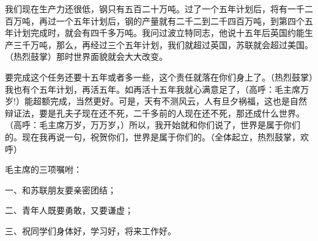 我们现在生产力还很低，钢只有五百二十万吨。过了一个五年计划后，将有一千二百万吨，再过一个五年计划后，钢的产量就有二千二到二千四百万吨，到第四个五年计划完成时，就会有四千多万吨。我问过波立特同志，他说十五年后英国约能生产三千万吨，那么，再经过三个五年计划，我们就超过英国，苏联就会超过美国。（热烈鼓掌）那时世界面貌就会大大改变。

要完成这个任务还要十五年或者多一些，这个责任就落在你们身上了。（热烈鼓掌）我也有个五年计划，再活五年。如再活十五年我就心满意足了，（高呼：毛主席万岁!）能超额完成，当然更好。可是，天有不测风云，人有旦夕祸福，这也是自然辩证法，要是孔夫子现在还不死，二千多前的人现在还不死，那还成什么世界。（高呼：毛主席万岁，万万岁，）所以，我开始就和你们说了，世界是属于你们的。现在我再说一句，祝贺你们，世界是属于你们的。（全体起立，热烈鼓掌，欢呼）

毛主席的三项嘱咐：

一、和苏联朋友要亲密团结；

二、青年人既要勇敢，又要谦虚；

三、祝同学们身体好，学习好，将来工作好。


